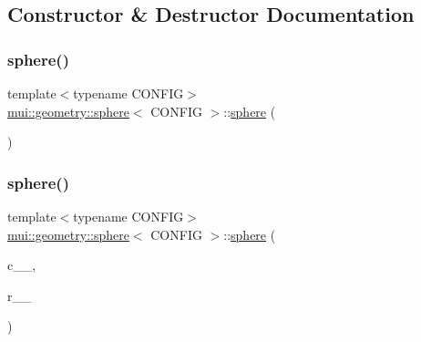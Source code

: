 \subsection{Constructor \& Destructor Documentation}
\mbox{\label{classmui_1_1geometry_1_1sphere_a51dd09ce04cca08525760688bded685f}} 
\subsubsection{\texorpdfstring{sphere()}{sphere()}\hspace{0.1cm}{\footnotesize\ttfamily [1/2]}}
{\footnotesize\ttfamily template$<$typename C\+O\+N\+F\+IG$>$ \\
\hyperlink{classmui_1_1geometry_1_1sphere}{mui\+::geometry\+::sphere}$<$ C\+O\+N\+F\+IG $>$\+::\hyperlink{classmui_1_1geometry_1_1sphere}{sphere} (\begin{DoxyParamCaption}{ }\end{DoxyParamCaption})\hspace{0.3cm}{\ttfamily [default]}}

\mbox{\label{classmui_1_1geometry_1_1sphere_aab6366d5ef9df6c490f0a18cd5f0bcfd}} 
\subsubsection{\texorpdfstring{sphere()}{sphere()}\hspace{0.1cm}{\footnotesize\ttfamily [2/2]}}
{\footnotesize\ttfamily template$<$typename C\+O\+N\+F\+IG$>$ \\
\hyperlink{classmui_1_1geometry_1_1sphere}{mui\+::geometry\+::sphere}$<$ C\+O\+N\+F\+IG $>$\+::\hyperlink{classmui_1_1geometry_1_1sphere}{sphere} (\begin{DoxyParamCaption}\item[{const coordinate\+\_\+type \&}]{c\+\_\+\+\_\+,  }\item[{R\+E\+AL}]{r\+\_\+\+\_\+ }\end{DoxyParamCaption})\hspace{0.3cm}{\ttfamily [inline]}}




